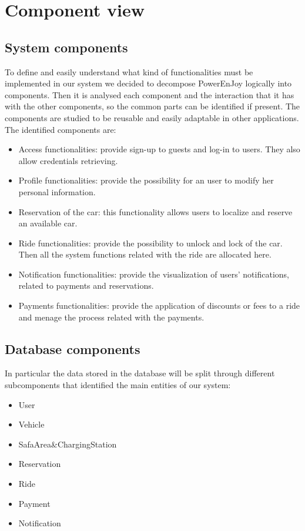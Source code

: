 \section{Component view}
\subsection{System components}
To define and easily understand what kind of functionalities must be implemented in our system we decided to decompose PowerEnJoy logically into components. Then it is analysed each component and the interaction that it has with the other components, so the common parts can be identified if present. The components are studied to be reusable and easily adaptable in other applications.
\\The identified components are:
\begin{itemize}
	\item Access functionalities: provide sign-up to guests and log-in to users. They also allow credentials retrieving.
	\item Profile functionalities: provide the possibility for an user to modify her personal information.
	\item Reservation of the car: this functionality allows users to localize and reserve an available car.
	\item Ride functionalities: provide the possibility to unlock and lock of the car. Then all the system functions related with the ride are allocated here. %
	\item Notification functionalities: provide the visualization of users' notifications, related to payments and reservations.%
	\item Payments functionalities: provide the application of discounts or fees to a ride and menage the process related with the payments.
\end{itemize}

\subsection{Database components}
In particular the data stored in the database will be split through different subcomponents that identified the main entities of our system:
\begin{itemize}
	\item User  %
	\item Vehicle 
	\item SafaArea\&ChargingStation
	\item Reservation 
	\item Ride
	\item Payment  
	\item Notification 
\end{itemize} %

